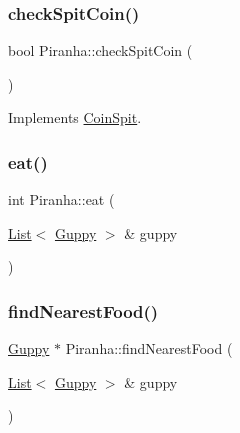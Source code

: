 \mbox{\label{class_piranha_a9db3ab2f9933739f5744e881f9ee386e}} 
\subsubsection{\texorpdfstring{check\+Spit\+Coin()}{checkSpitCoin()}}
{\footnotesize\ttfamily bool Piranha\+::check\+Spit\+Coin (\begin{DoxyParamCaption}{ }\end{DoxyParamCaption})\hspace{0.3cm}{\ttfamily [virtual]}}



Implements \mbox{\hyperlink{class_coin_spit_a9471108f825dc67a35ac1a35444b84fd}{Coin\+Spit}}.

\mbox{\label{class_piranha_ab7d97cc3807c53205937ad830f43e3bb}} 
\subsubsection{\texorpdfstring{eat()}{eat()}}
{\footnotesize\ttfamily int Piranha\+::eat (\begin{DoxyParamCaption}\item[{\mbox{\hyperlink{class_list}{List}}$<$ \mbox{\hyperlink{class_guppy}{Guppy}} $>$ \&}]{guppy }\end{DoxyParamCaption})}

\mbox{\label{class_piranha_a8f8e2a2d3e0ff7a0c712cf78ca578fa8}} 
\subsubsection{\texorpdfstring{find\+Nearest\+Food()}{findNearestFood()}}
{\footnotesize\ttfamily \mbox{\hyperlink{class_guppy}{Guppy}} $\ast$ Piranha\+::find\+Nearest\+Food (\begin{DoxyParamCaption}\item[{\mbox{\hyperlink{class_list}{List}}$<$ \mbox{\hyperlink{class_guppy}{Guppy}} $>$ \&}]{guppy }\end{DoxyParamCaption})}

